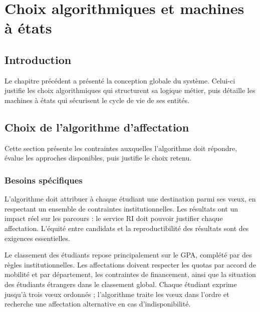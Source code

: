 \chapter{Choix algorithmiques et machines à états}
\label{cha:algo-fsm}
\begingroup
\let\clearpage\relax
\startcontents[chapters]
\endgroup
\newpage

\section*{Introduction}
\justifying
{}
{}

Le chapitre précédent a présenté la conception globale du système. Celui-ci justifie les choix algorithmiques qui structurent sa logique métier, puis détaille les machines à états qui sécurisent le cycle de vie de ses entités.

\section{Choix de l'algorithme d'affectation}

Cette section présente les contraintes auxquelles l'algorithme doit
répondre, évalue les approches disponibles, puis justifie le choix retenu.

\subsection{Besoins spécifiques}

L'algorithme doit attribuer à chaque étudiant une destination parmi ses
vœux, en respectant un ensemble de contraintes institutionnelles. Les
résultats ont un impact réel sur les parcours : le service RI doit pouvoir
justifier chaque affectation. L'équité entre candidats et la
reproductibilité des résultats sont des exigences essentielles.

Le classement des étudiants repose principalement sur le GPA, complété
par des règles institutionnelles. Les affectations doivent respecter
les quotas par accord de mobilité et par département, les contraintes
de financement, ainsi que la situation des étudiants étrangers dans
le classement global. Chaque étudiant exprime jusqu'à trois vœux
ordonnés ; l'algorithme traite les vœux dans l'ordre et recherche
une affectation alternative en cas d'indisponibilité.

